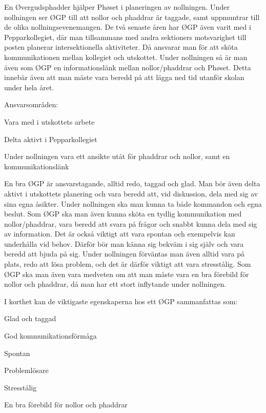 \documentclass[10pt]{article}
\def\post{Øvergudsphadder}
\def\doctitle{Kravprofil för \post}
\begin{document}
\heading{\doctitle}

En Øvergudsphadder hjälper Phøset i planeringen av nollningen. Under nollningen ser ØGP till att nollor och phaddrar är taggade, samt uppmuntrar till de olika nollningsevenemangen. 
De två senaste åren har ØGP även varit med i Pepparkollegiet, där man tillsammans med andra sektioners motsvarighet till posten planerar intersektionella aktiviteter. Då ansvarar man för att sköta kommunikationen mellan kollegiet och utskottet. 
Under nollningen så är man även som ØGP en informationslänk mellan nollor/phaddrar och Phøset. 
Detta innebär även att man måste vara beredd på att lägga ned tid utanför skolan under hela året.


Ansvarsområden:
\begin{dashlist}
    \item Vara med i utskottets arbete
    \item Delta aktivt i Pepparkollegiet
    \item Under nollningen vara ett ansikte utåt för phaddrar och nollor, samt en kommunikationslänk
    \end{dashlist}

En bra ØGP är ansvarstagande, alltid redo, taggad och glad. Man bör även delta aktivt i utskottets planering och vara beredd att, vid diskussion, dela med sig av sina egna åsikter.
Under nollningen ska man kunna ta både kommandon och egna beslut. Som ØGP ska man även kunna sköta en tydlig kommunikation med nollor/phaddrar, vara beredd att svara på frågor och snabbt kunna dela med sig av information. 
Det är också viktigt att vara spontan och exempelvis kan underhålla vid behov. Därför bör man känna sig bekväm i sig själv och vara beredd att bjuda på sig. Under nollningen förväntas man även alltid vara på plats, redo att lösa problem, och det är därför viktigt att vara stresstålig. 
Som ØGP ska man även vara medveten om att man måste vara en bra förebild för nollor och phaddrar, då man har ett stort inflytande under nollningen.

I korthet kan de viktigaste egenskaperna hos ett ØGP sammanfattas som:
\begin{dashlist}
    \item Glad och taggad
    \item God kommunikationsförmåga
    \item Spontan
    \item Problemlösare
    \item Stresstålig
    \item En bra förebild för nollor och phaddrar
\end{dashlist}
\end{document}
